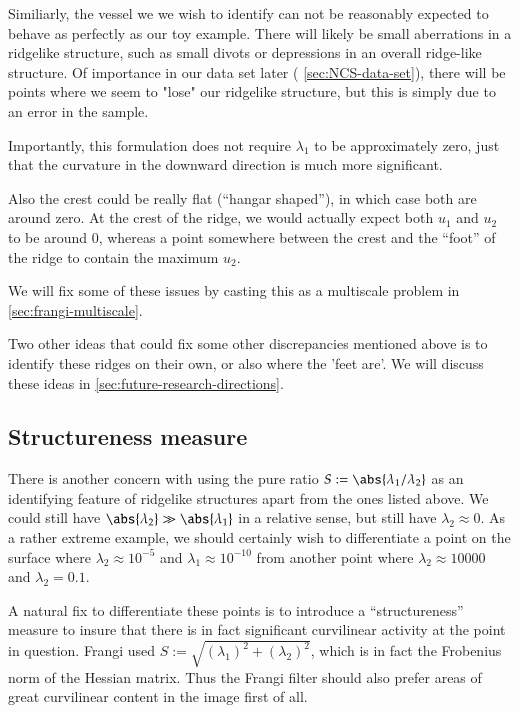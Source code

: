 Similiarly, the vessel we we wish to identify can not be reasonably expected to behave as perfectly as our toy example. There will likely be small aberrations in a ridgelike structure, such as small divots or depressions in an overall ridge-like structure. Of importance in our data set later ( \cref{sec:NCS-data-set}), there will be points where we seem to "lose" our ridgelike structure,
but this is simply due to an error in the sample.

Importantly, this formulation does not require $\lambda_1$ to be approximately zero, just that the curvature in the downward direction is much more significant.

Also the crest could be really flat (``hangar shaped''), in which case both are around zero. At the crest of the ridge, we would actually expect both $u_1$ and $u_2$ to be around 0, whereas a point somewhere between the crest and the ``foot'' of the ridge to contain the maximum $u_2$.

We will fix some of these issues by casting this as a multiscale problem in \cref{sec:frangi-multiscale}.

Two other ideas that could fix some other discrepancies mentioned above is to identify these ridges on their own, or also where the 'feet are'. We will discuss these ideas in \cref{sec:future-research-directions}.

\subsection{Structureness measure} \label{sec:frangi-structureness}

There is another concern with using the pure ratio $S:= \abs{\lambda_1 / \lambda_2}$ as an identifying feature of ridgelike structures apart from the ones listed above. We could still have $\abs{\lambda_2} \gg \abs{\lambda_1}$ in a relative sense, but still have $\lambda_2 \approx 0$. As a rather extreme example, we should certainly wish to differentiate a point on the surface where $\lambda_2 \approx 10^{-5} $ and $\lambda_1 \approx 10^{-10}$ from another point where $\lambda_2 \approx 10000$ and $\lambda_2 = 0.1$.

A natural fix to differentiate these points is to introduce a ``structureness'' measure to insure that there is in fact significant curvilinear activity at the point in question. Frangi used $S:= \sqrt{(\lambda_1)^2 + (\lambda_2)^2}$, which is in fact the Frobenius norm of the Hessian matrix. Thus the Frangi filter should also prefer areas of
great curvilinear content in the image first of all.


